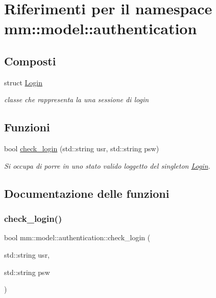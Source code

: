 \hypertarget{namespacemm_1_1model_1_1authentication}{}\section{Riferimenti per il namespace mm\+:\+:model\+:\+:authentication}
\label{namespacemm_1_1model_1_1authentication}
\subsection*{Composti}
\begin{DoxyCompactItemize}
\item 
struct \mbox{\hyperlink{structmm_1_1model_1_1authentication_1_1_login}{Login}}
\begin{DoxyCompactList}\small\item\em classe che rappresenta la una sessione di login \end{DoxyCompactList}\end{DoxyCompactItemize}
\subsection*{Funzioni}
\begin{DoxyCompactItemize}
\item 
bool \mbox{\hyperlink{namespacemm_1_1model_1_1authentication_aeb56a39665f657663af73f37a6341f11}{check\+\_\+login}} (std\+::string usr, std\+::string psw)
\begin{DoxyCompactList}\small\item\em Si occupa di porre in uno stato valido l\textquotesingle{}oggetto del singleton \mbox{\hyperlink{structmm_1_1model_1_1authentication_1_1_login}{Login}}. \end{DoxyCompactList}\end{DoxyCompactItemize}


\subsection{Documentazione delle funzioni}
\mbox{\label{namespacemm_1_1model_1_1authentication_aeb56a39665f657663af73f37a6341f11}} 
\subsubsection{\texorpdfstring{check\+\_\+login()}{check\_login()}}
{\footnotesize\ttfamily bool mm\+::model\+::authentication\+::check\+\_\+login (\begin{DoxyParamCaption}\item[{std\+::string}]{usr,  }\item[{std\+::string}]{psw }\end{DoxyParamCaption})}



